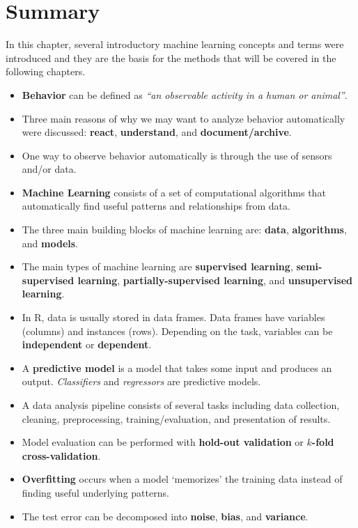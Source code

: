 \documentclass[
  11pt,
]{krantz}
\providecommand{\tightlist}{%
  \setlength{\itemsep}{0pt}\setlength{\parskip}{0pt}}
\begin{document}
\newpage
\FloatBarrier

\hypertarget{SummaryIntro}{%
\section{Summary}\label{SummaryIntro}}

In this chapter, several introductory machine learning concepts and terms were introduced and they are the basis for the methods that will be covered in the following chapters.

\begin{itemize}
\tightlist
\item
  \textbf{Behavior} can be defined as \emph{``an observable activity in a human or animal''}.
\item
  Three main reasons of why we may want to analyze behavior automatically were discussed: \textbf{react}, \textbf{understand}, and \textbf{document/archive}.
\item
  One way to observe behavior automatically is through the use of sensors and/or data.
\item
  \textbf{Machine Learning} consists of a set of computational algorithms that automatically find useful patterns and relationships from data.
\item
  The three main building blocks of machine learning are: \textbf{data}, \textbf{algorithms}, and \textbf{models}.
\item
  The main types of machine learning are \textbf{supervised learning}, \textbf{semi-supervised learning}, \textbf{partially-supervised learning}, and \textbf{unsupervised learning}.
\item
  In R, data is usually stored in data frames. Data frames have variables (columns) and instances (rows). Depending on the task, variables can be \textbf{independent} or \textbf{dependent}.
\item
  A \textbf{predictive model} is a model that takes some input and produces an output. \emph{Classifiers} and \emph{regressors} are predictive models.
\item
  A data analysis pipeline consists of several tasks including data collection, cleaning, preprocessing, training/evaluation, and presentation of results.
\item
  Model evaluation can be performed with \textbf{hold-out validation} or \textbf{\(k\)-fold cross-validation}.
\item
  \textbf{Overfitting} occurs when a model `memorizes' the training data instead of finding useful underlying patterns.
\item
  The test error can be decomposed into \textbf{noise}, \textbf{bias}, and \textbf{variance}.
\end{itemize}
\end{document}
